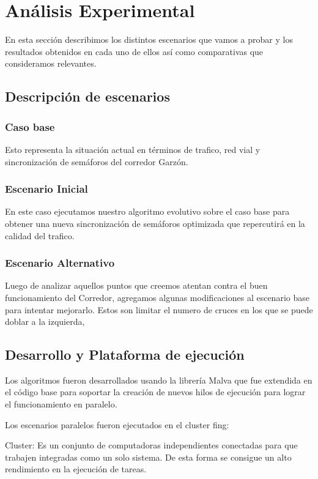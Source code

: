 \chapter{Análisis Experimental}
En esta sección describimos los distintos escenarios que vamos a probar y los resultados obtenidos en cada uno de ellos así como comparativas que consideramos relevantes.

\section{Descripción de escenarios}

\subsection{Caso base}
Esto representa la situación actual en términos de trafico, red vial y sincronización de semáforos del corredor Garzón. 

\subsection{Escenario Inicial }
En este caso ejecutamos nuestro algoritmo evolutivo sobre el caso base para obtener una nueva sincronización de semáforos optimizada que repercutirá en la calidad del trafico.

\subsection{Escenario Alternativo}
Luego de analizar aquellos puntos que creemos atentan contra el buen funcionamiento del Corredor, agregamos algunas modificaciones al escenario base para intentar mejorarlo. 
Estos son limitar el numero de cruces en los que se puede doblar a la izquierda, 



\section{Desarrollo y Plataforma de ejecución }
Los algoritmos fueron desarrollados usando la librería Malva que fue extendida en el código base para soportar la creación de nuevos hilos de ejecución para lograr el funcionamiento en paralelo.



Los escenarios paralelos fueron ejecutados en el cluster fing:

Cluster: Es un conjunto de computadoras independientes conectadas para que trabajen integradas como un solo sistema. De esta forma se consigue un alto rendimiento en la ejecución de tareas. 


